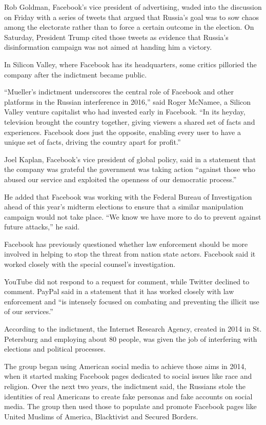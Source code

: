 Rob Goldman, Facebook's vice president of advertising, waded into the
discussion on Friday with a series of tweets that argued that Russia's
goal was to sow chaos among the electorate rather than to force a
certain outcome in the election. On Saturday, President Trump cited
those tweets as evidence that Russia's disinformation campaign was not
aimed at handing him a victory.

In Silicon Valley, where Facebook has its headquarters, some critics
pilloried the company after the indictment became public.

``Mueller's indictment underscores the central role of Facebook and
other platforms in the Russian interference in 2016,'' said Roger
McNamee, a Silicon Valley venture capitalist who had invested early in
Facebook. ``In its heyday, television brought the country together,
giving viewers a shared set of facts and experiences. Facebook does just
the opposite, enabling every user to have a unique set of facts, driving
the country apart for profit.''

Joel Kaplan, Facebook's vice president of global policy, said in a
statement that the company was grateful the government was taking action
``against those who abused our service and exploited the openness of our
democratic process.''

He added that Facebook was working with the Federal Bureau of
Investigation ahead of this year's midterm elections to ensure that a
similar manipulation campaign would not take place. ``We know we have
more to do to prevent against future attacks,'' he said.

Facebook has previously questioned whether law enforcement should be
more involved in helping to stop the threat from nation state actors.
Facebook said it worked closely with the special counsel's
investigation.

YouTube did not respond to a request for comment, while Twitter declined
to comment. PayPal said in a statement that it has worked closely with
law enforcement and ``is intensely focused on combating and preventing
the illicit use of our services.''

According to the indictment, the Internet Research Agency, created in
2014 in St. Petersburg and employing about 80 people, was given the job
of interfering with elections and political processes.

The group began using American social media to achieve those aims in
2014, when it started making Facebook pages dedicated to social issues
like race and religion. Over the next two years, the indictment said,
the Russians stole the identities of real Americans to create fake
personas and fake accounts on social media. The group then used those to
populate and promote Facebook pages like United Muslims of America,
Blacktivist and Secured Borders.

